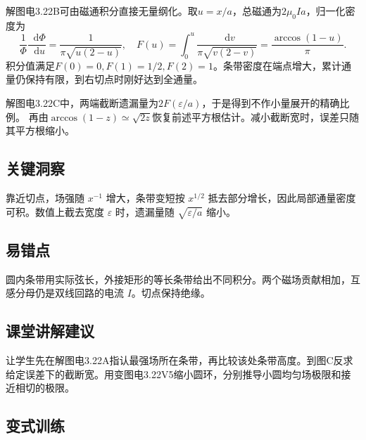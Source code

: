 \documentclass[UTF8,fontset=fandol,a4paper,11pt]{ctexart}
\newcommand{\dd}{\mathop{}\!\mathrm{d}}
\begin{document}
解图电3.22B可由磁通积分直接无量纲化。取$u=x/a$，总磁通为$2\mu_0Ia$，归一化密度为
\[
\frac1\Phi\frac{\dd\Phi}{\dd u}=\frac1{\pi\sqrt{u(2-u)}},\quad
F(u)=\int_0^u\frac{\dd v}{\pi\sqrt{v(2-v)}}=\frac{\arccos(1-u)}\pi.
\]
积分值满足$F(0)=0,F(1)=1/2,F(2)=1$。条带密度在端点增大，累计通量仍保持有限，到右切点时刚好达到全通量。

解图电3.22C中，两端截断遗漏量为$2F(\varepsilon/a)$，于是得到不作小量展开的精确比例。
再由$\arccos(1-z)\simeq\sqrt{2z}$恢复前述平方根估计。减小截断宽时，误差只随其平方根缩小。




\subsection*{关键洞察}

靠近切点，场强随 $x^{-1}$ 增大，条带变短按 $x^{1/2}$ 抵去部分增长，因此局部通量密度可积。数值上截去宽度 $\varepsilon$ 时，遗漏量随 $\sqrt{\varepsilon/a}$ 缩小。



\subsection*{易错点}

圆内条带用实际弦长，外接矩形的等长条带给出不同积分。两个磁场贡献相加，互感分母仍是双线回路的电流 $I$。切点保持绝缘。



\subsection*{课堂讲解建议}

让学生先在解图电3.22A指认最强场所在条带，再比较该处条带高度。到图C反求给定误差下的截断宽。用变图电3.22V5缩小圆环，分别推导小圆均匀场极限和接近相切的极限。


\subsection*{变式训练}
\end{document}

